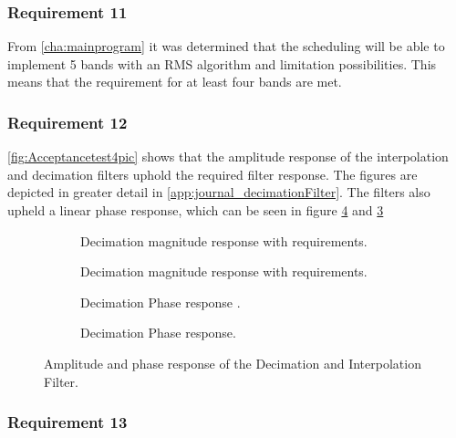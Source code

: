 \subsubsection*{Requirement 11}

From \autoref{cha:mainprogram} it was determined that the scheduling will be able to implement 5 bands with an RMS algorithm and limitation possibilities. This means that the requirement for at least four bands are met. 
\vspace*{-5mm}
\subsubsection*{Requirement 12}
\autoref{fig:Acceptancetest4pic} shows that the amplitude response of the interpolation and decimation filters uphold the required filter response. The figures are depicted in greater detail in \autoref{app:journal_decimationFilter}. The filters also upheld a linear phase response, which can be seen in figure \ref{fig:AcceptIntPhase2} and \ref{fig:AcceptDecPhase2}
\begin{figure}[H]
\centering
\begin{subfigure}[t]{0.45\textwidth}
	\centering
	
	\caption{Decimation magnitude response with requirements.}
	\label{fig:acceptDecMag2}
\end{subfigure}
\hfill
\begin{subfigure}[t]{0.45\textwidth}
	\centering
	
	\caption{Decimation magnitude response with requirements.}
	\label{fig:acceptIntMag2}
\end{subfigure} 
\begin{subfigure}[t]{0.45\textwidth}
	\centering
	
	\caption{Decimation Phase response .}
	\label{fig:AcceptDecPhase2}
\end{subfigure} 
\hfill
\begin{subfigure}[t]{0.45\textwidth}
	\centering
	
	\caption{Decimation Phase response.}
	\label{fig:AcceptIntPhase2}
\end{subfigure} 
\caption{Amplitude and phase response of the Decimation and Interpolation Filter.}
\label{fig:Acceptancetest4pic}
\end{figure}
\vspace*{-5mm}
\subsubsection*{Requirement 13}


